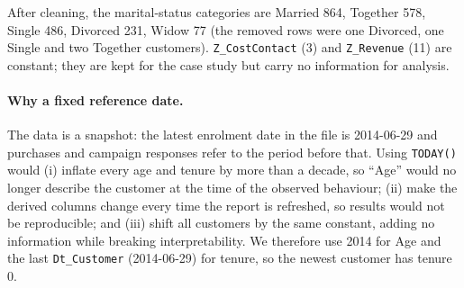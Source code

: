 \documentclass[11pt]{article}
\begin{document}
After cleaning, the marital-status categories are Married 864, Together 578, Single 486,
Divorced 231, Widow 77 (the removed rows were one Divorced, one Single and two Together customers).
\texttt{Z\_CostContact} (3) and \texttt{Z\_Revenue} (11) are constant; they are kept for the
case study but carry no information for analysis.

\paragraph{Why a fixed reference date.}
The data is a snapshot: the latest enrolment date in the file is 2014-06-29 and purchases and
campaign responses refer to the period before that. Using \texttt{TODAY()} would (i) inflate
every age and tenure by more than a decade, so ``Age'' would no longer describe the customer at
the time of the observed behaviour; (ii) make the derived columns change every time the report is
refreshed, so results would not be reproducible; and (iii) shift all customers by the same
constant, adding no information while breaking interpretability. We therefore use 2014 for Age
and the last \texttt{Dt\_Customer} (2014-06-29) for tenure, so the newest customer has tenure 0.
\end{document}
